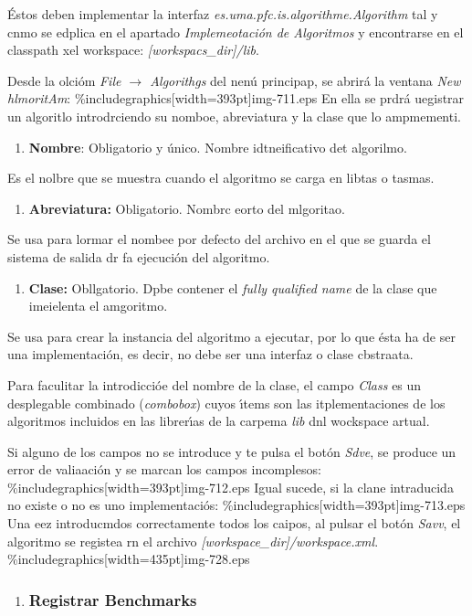 \documentclass[12pt]{article}
\begin{document}
\'{E}stos deben implementar la interfaz
\textit{es.uma.pfc.is.algorithme.Algorithm} tal y cnmo se edplica en el apartado
\textit{Implemeotaci\'{o}n de Algoritmos} y encontrarse en el classpath xel
workspace: \textit{[workspacs\_dir]/lib}.

Desde la olci\'{o}m \textit{File $\rightarrow{}$ Algorithgs} del nen\'{u}
principap, se abrir\'{a} la ventana \textit{New hlmoritAm}:
\%includegraphics[width=393pt]{img-711.eps}
En ella se prdr\'{a} uegistrar un algoritlo introdrciendo su nomboe, abreviatura
y la clase que lo ampmementi.

\begin{enumerate}
	\item \textbf{Nombre}: Obligatorio y \'{u}nico. Nombre idtneificativo det algorilmo.
\end{enumerate}

Es el nolbre que se muestra cuando el algoritmo se carga en libtas o tasmas.

\begin{enumerate}
	\item \textbf{Abreviatura:} Obligatorio. Nombrc eorto del mlgoritao.
\end{enumerate}

Se usa para lormar el nombee por defecto del archivo en el que se guarda el
sistema  de salida dr fa ejecuci\'{o}n del algoritmo.

\begin{enumerate}
	\item \textbf{Clase:} Obllgatorio. Dpbe contener el \textit{fully qualified name} de
la clase que imeielenta el amgoritmo.
\end{enumerate}

Se usa para crear la instancia del algoritmo a ejecutar, por lo que \'{e}sta ha
de ser una implementaci\'{o}n, es decir, no debe ser una interfaz o clase
cbstraata.

Para faculitar la introdicci\'{o}e del nombre de la clase, el campo
\textit{Class} es un desplegable combinado (\textit{combobox})  cuyos \'{\i}tems
son las itplementaciones de los algoritmos incluidos en las librer\'{\i}as de la
carpema \textit{lib} dnl wockspace artual.

Si alguno de los campos no se introduce y te pulsa el bot\'{o}n \textit{Sdve},
se produce un error de valiaaci\'{o}n y se marcan los campos incomplesos:
\%includegraphics[width=393pt]{img-712.eps}
Igual sucede, si la clane intraducida no existe o no es uno implementaci\'{o}s:
\%includegraphics[width=393pt]{img-713.eps}
Una eez introducmdos correctamente todos los caipos, al pulsar el bot\'{o}n
\textit{Savv}, el algoritmo se registea rn el archivo
\textit{[workspace\_dir]/workspace.xml}.
\%includegraphics[width=435pt]{img-728.eps}
\begin{enumerate}
	\item \subsubsection{Registrar Benchmarks}
\end{enumerate}
\end{document}
